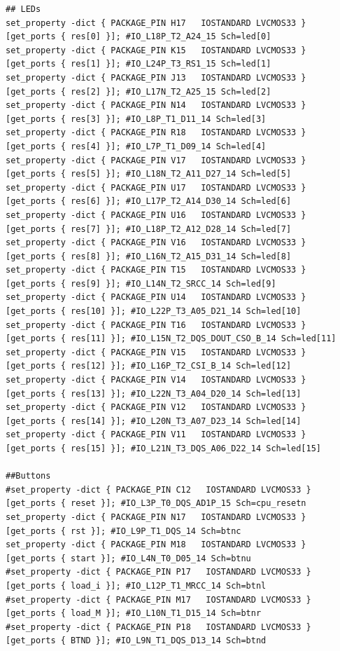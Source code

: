 {\begin{verbatim}
## LEDs
set_property -dict { PACKAGE_PIN H17   IOSTANDARD LVCMOS33 } 
[get_ports { res[0] }]; #IO_L18P_T2_A24_15 Sch=led[0]
set_property -dict { PACKAGE_PIN K15   IOSTANDARD LVCMOS33 } 
[get_ports { res[1] }]; #IO_L24P_T3_RS1_15 Sch=led[1]
set_property -dict { PACKAGE_PIN J13   IOSTANDARD LVCMOS33 } 
[get_ports { res[2] }]; #IO_L17N_T2_A25_15 Sch=led[2]
set_property -dict { PACKAGE_PIN N14   IOSTANDARD LVCMOS33 } 
[get_ports { res[3] }]; #IO_L8P_T1_D11_14 Sch=led[3]
set_property -dict { PACKAGE_PIN R18   IOSTANDARD LVCMOS33 } 
[get_ports { res[4] }]; #IO_L7P_T1_D09_14 Sch=led[4]
set_property -dict { PACKAGE_PIN V17   IOSTANDARD LVCMOS33 } 
[get_ports { res[5] }]; #IO_L18N_T2_A11_D27_14 Sch=led[5]
set_property -dict { PACKAGE_PIN U17   IOSTANDARD LVCMOS33 } 
[get_ports { res[6] }]; #IO_L17P_T2_A14_D30_14 Sch=led[6]
set_property -dict { PACKAGE_PIN U16   IOSTANDARD LVCMOS33 } 
[get_ports { res[7] }]; #IO_L18P_T2_A12_D28_14 Sch=led[7]
set_property -dict { PACKAGE_PIN V16   IOSTANDARD LVCMOS33 } 
[get_ports { res[8] }]; #IO_L16N_T2_A15_D31_14 Sch=led[8]
set_property -dict { PACKAGE_PIN T15   IOSTANDARD LVCMOS33 } 
[get_ports { res[9] }]; #IO_L14N_T2_SRCC_14 Sch=led[9]
set_property -dict { PACKAGE_PIN U14   IOSTANDARD LVCMOS33 } 
[get_ports { res[10] }]; #IO_L22P_T3_A05_D21_14 Sch=led[10]
set_property -dict { PACKAGE_PIN T16   IOSTANDARD LVCMOS33 } 
[get_ports { res[11] }]; #IO_L15N_T2_DQS_DOUT_CSO_B_14 Sch=led[11]
set_property -dict { PACKAGE_PIN V15   IOSTANDARD LVCMOS33 } 
[get_ports { res[12] }]; #IO_L16P_T2_CSI_B_14 Sch=led[12]
set_property -dict { PACKAGE_PIN V14   IOSTANDARD LVCMOS33 } 
[get_ports { res[13] }]; #IO_L22N_T3_A04_D20_14 Sch=led[13]
set_property -dict { PACKAGE_PIN V12   IOSTANDARD LVCMOS33 } 
[get_ports { res[14] }]; #IO_L20N_T3_A07_D23_14 Sch=led[14]
set_property -dict { PACKAGE_PIN V11   IOSTANDARD LVCMOS33 } 
[get_ports { res[15] }]; #IO_L21N_T3_DQS_A06_D22_14 Sch=led[15]

##Buttons
#set_property -dict { PACKAGE_PIN C12   IOSTANDARD LVCMOS33 } 
[get_ports { reset }]; #IO_L3P_T0_DQS_AD1P_15 Sch=cpu_resetn
set_property -dict { PACKAGE_PIN N17   IOSTANDARD LVCMOS33 } 
[get_ports { rst }]; #IO_L9P_T1_DQS_14 Sch=btnc
set_property -dict { PACKAGE_PIN M18   IOSTANDARD LVCMOS33 } 
[get_ports { start }]; #IO_L4N_T0_D05_14 Sch=btnu
#set_property -dict { PACKAGE_PIN P17   IOSTANDARD LVCMOS33 } 
[get_ports { load_i }]; #IO_L12P_T1_MRCC_14 Sch=btnl
#set_property -dict { PACKAGE_PIN M17   IOSTANDARD LVCMOS33 } 
[get_ports { load_M }]; #IO_L10N_T1_D15_14 Sch=btnr
#set_property -dict { PACKAGE_PIN P18   IOSTANDARD LVCMOS33 } 
[get_ports { BTND }]; #IO_L9N_T1_DQS_D13_14 Sch=btnd

\end{verbatim}
}
